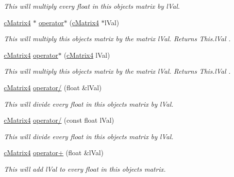 \begin{DoxyCompactItemize}
\begin{DoxyCompactList}\small\item\em This will multiply every float in this objects matrix by lVal. \item\end{DoxyCompactList}\item 
\hyperlink{classc_matrix4}{cMatrix4} $\ast$ \hyperlink{classc_matrix4_aa202a3e23b2d693672265d15304f92e0}{operator$\ast$} (\hyperlink{classc_matrix4}{cMatrix4} $\ast$lVal)
\begin{DoxyCompactList}\small\item\em This will multiply this objects matrix by the matrix lVal. Returns This.lVal . \item\end{DoxyCompactList}\item 
\hyperlink{classc_matrix4}{cMatrix4} \hyperlink{classc_matrix4_a53abd84689f1a69f2aca3e51956956f6}{operator$\ast$} (\hyperlink{classc_matrix4}{cMatrix4} lVal)
\begin{DoxyCompactList}\small\item\em This will multiply this objects matrix by the matrix lVal. Returns This.lVal . \item\end{DoxyCompactList}\item 
\hyperlink{classc_matrix4}{cMatrix4} \hyperlink{classc_matrix4_a219d42de683b8bb377e8fe2bbabf9a67}{operator/} (float \&lVal)
\begin{DoxyCompactList}\small\item\em This will divide every float in this objects matrix by lVal. \item\end{DoxyCompactList}\item 
\hyperlink{classc_matrix4}{cMatrix4} \hyperlink{classc_matrix4_a889631de90fa981083badaef363e579b}{operator/} (const float lVal)
\begin{DoxyCompactList}\small\item\em This will divide every float in this objects matrix by lVal. \item\end{DoxyCompactList}\item 
\hyperlink{classc_matrix4}{cMatrix4} \hyperlink{classc_matrix4_a107b1006370869b4315364a20982333d}{operator+} (float \&lVal)
\begin{DoxyCompactList}\small\item\em This will add lVal to every float in this objects matrix. \item\end{DoxyCompactList}\item 

\end{DoxyCompactItemize}
